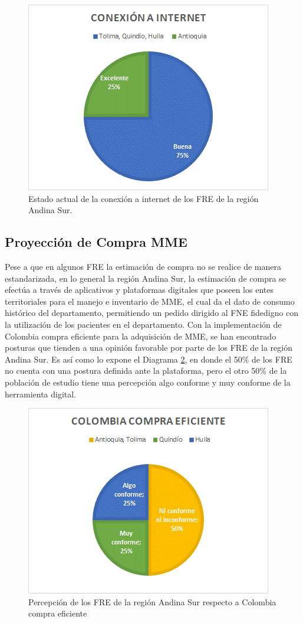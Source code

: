 \documentclass[
]{book}
\begin{document}
\begin{figure}

{\centering \includegraphics[width=0.5\linewidth]{figures/Imagen20} 

}

\caption{Estado actual de la conexión a internet de los FRE de la región Andina Sur.}\label{fig:ConexionInternetRegionAndinaSur}
\end{figure}

\hypertarget{proyecciuxf3n-de-compra-mme-1}{%
\subsection{Proyección de Compra MME}\label{proyecciuxf3n-de-compra-mme-1}}

Pese a que en algunos FRE la estimación de compra no se realice de manera estandarizada, en lo general la región Andina Sur, la estimación de compra se efectúa a través de aplicativos y plataformas digitales que poseen los entes territoriales para el manejo e inventario de MME, el cual da el dato de consumo histórico del departamento, permitiendo un pedido dirigido al FNE fidedigno con la utilización de los pacientes en el departamento.
Con la implementación de Colombia compra eficiente para la adquisición de MME, se han encontrado posturas que tienden a una opinión favorable por parte de los FRE de la región Andina Sur. Es así como lo expone el Diagrama \ref{fig:PercepcionCompraEfRegionAndinaSur}, en donde el 50\% de los FRE no cuenta con una postura definida ante la plataforma, pero el otro 50\% de la población de estudio tiene una percepción algo conforme y muy conforme de la herramienta digital.

\begin{figure}

{\centering \includegraphics[width=0.5\linewidth]{figures/Imagen21} 

}

\caption{Percepción de los FRE de la región Andina Sur respecto a Colombia compra eficiente}\label{fig:PercepcionCompraEfRegionAndinaSur}
\end{figure}
\end{document}
